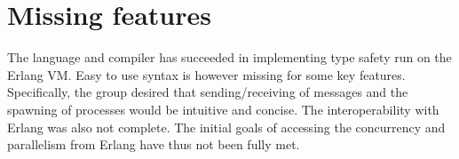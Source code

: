 \section{Missing features}

The language and compiler has succeeded in implementing type safety run on the Erlang VM. Easy to use syntax is however missing for some key features. Specifically, the group desired that sending/receiving of messages and the spawning of processes would be intuitive and concise. The interoperability with Erlang was also not complete. The initial goals of accessing the concurrency and parallelism from Erlang have thus not been fully met.